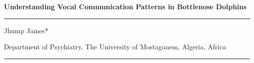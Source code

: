 \documentclass{article}
\begin{document}
\vspace*{1cm} %

\begin{flushleft}
    {\fontsize{16}{22}\selectfont\color{color_29791}
    \textbf{Understanding Vocal Communication Patterns in Bottlenose Dolphins}\par
    }
    \vspace{0cm}
    \color{color_100238}\rule{0.97\textwidth}{0.5pt}
    \vspace{0.1cm}
\end{flushleft}


\begin{flushleft}
\vspace*{-0.5cm}
    \fontsize{11}{13.2}\selectfont\color{color_29791}Jhump James*\par
    \vspace{0cm}
    \fontsize{9}{10.8}\selectfont\color{color_29791}Department of Psychiatry, The University of Mostaganem, Algeria, Africa\par
    \vspace{0.1cm}
    \color{color_100238}\rule{0.6\textwidth}{1pt}
\end{flushleft}
\end{document}
